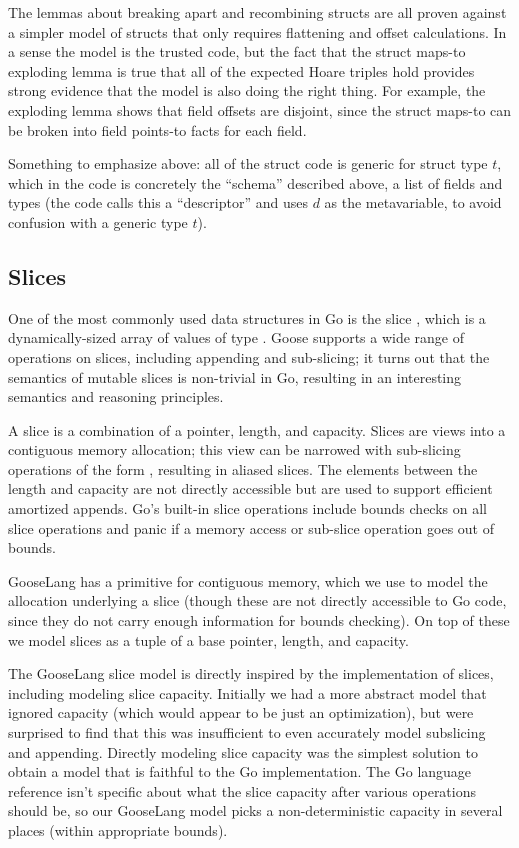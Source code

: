 The lemmas about breaking apart and recombining structs are all proven
against a simpler model of structs that only requires flattening and
offset calculations. In a sense the model is the trusted code, but the
fact that the struct maps-to exploding lemma is true that all of the
expected Hoare triples hold provides strong evidence that the model is
also doing the right thing. For example, the exploding lemma shows that
field offsets are disjoint, since the struct maps-to can be broken into
field points-to facts for each field.

Something to emphasize above: all of the struct code is generic for
struct type $t$, which in the code is concretely the ``schema''
described above, a list of fields and types (the code calls this a
``descriptor'' and uses $d$ as the metavariable, to avoid confusion
with a generic type $t$). 

\subsection{Slices}

One of the most commonly used data structures in Go is the slice
, which is a dynamically-sized array of values of type
. Goose supports a wide range of operations on slices,
including appending and sub-slicing; it turns out that the semantics of
mutable slices is non-trivial in Go, resulting in an interesting
semantics and reasoning principles.

A slice is a combination of a pointer, length, and capacity. Slices are
views into a contiguous memory allocation; this view can be narrowed
with sub-slicing operations of the form , resulting
in aliased slices. The elements between the length and capacity are not
directly accessible but are used to support efficient amortized appends.
Go's built-in slice operations include bounds checks on all slice
operations and panic if a memory access or sub-slice operation goes out
of bounds.

GooseLang has a primitive for contiguous memory, which we use to model
the allocation underlying a slice (though these are not directly
accessible to Go code, since they do not carry enough information for
bounds checking). On top of these we model slices as a tuple of a base
pointer, length, and capacity.

The GooseLang slice model is directly inspired by the implementation of
slices, including modeling slice capacity. Initially we had a more
abstract model that ignored capacity (which would appear to be just an
optimization), but were surprised to find that this was insufficient to
even accurately model subslicing and appending. Directly modeling slice
capacity was the simplest solution to obtain a model that is faithful to
the Go implementation. The Go language reference isn't specific about
what the slice capacity after various operations should be, so our
GooseLang model picks a non-deterministic capacity in several places
(within appropriate bounds).

